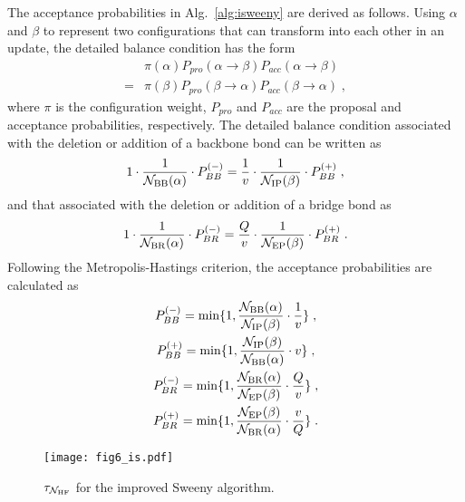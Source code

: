 \documentclass[aps,pre,twocolumn,superscriptaddress,longbibliography,floatfix]{revtex4-2}
\begin{document}
The acceptance probabilities in Alg.~\ref{alg:isweeny} are derived as follows.
Using {$\alpha$ and $\beta$} to represent two configurations that can transform into each other in an update, the detailed balance condition has the form
\begin{align}
&\pi(\alpha){P_{pro}}(\alpha\rightarrow \beta){P_{acc}}(\alpha \rightarrow \beta)\\ \nonumber
=&\pi(\beta){P_{pro}}(\beta\rightarrow \alpha){P_{acc}}(\beta \rightarrow \alpha) \;,
\end{align}
where $\pi$ is the configuration weight, $P_{pro}$ and $P_{acc}$ are the proposal and acceptance probabilities, respectively.
The detailed balance condition associated with the deletion or addition of a backbone bond can be written as
\begin{align}
    1 \cdot \frac{1}{\mathcal{N}_{\rm BB}(\alpha)} \cdot P^{(-)}_{BB} = \frac{1}{v} \cdot \frac{1}{\mathcal{N}_{\rm IP}(\beta)} \cdot P^{(+)}_{BB} \;, 
\end{align}
and that associated with the deletion or addition of a bridge bond as
\begin{align}
    1 \cdot \frac{1}{\mathcal{N}_{\rm BR}(\alpha)} \cdot P^{(-)}_{BR} = \frac{Q}{v} \cdot \frac{1}{\mathcal{N}_{\rm EP}(\beta)} \cdot P^{(+)}_{BR} \;.
\end{align}
Following the Metropolis-Hastings criterion, the acceptance probabilities are calculated as
\begin{gather}
     P^{(-)}_{BB} =\min \{ 1,\frac{\mathcal{N}_{\rm BB}(\alpha)}{\mathcal{N}_{\rm IP}(\beta)} \cdot \frac{1}{v} \} \;,\label{eq:accDeletingBB} \\
     P^{(+)}_{BB} =\min \{ 1,\frac{\mathcal{N}_{\rm IP}(\beta)}{\mathcal{N}_{\rm BB}(\alpha)} \cdot v \} \;,  \\
     P^{(-)}_{BR} =\min \{ 1,\frac{\mathcal{N}_{\rm BR}(\alpha)}{\mathcal{N}_{\rm EP}(\beta)} \cdot \frac{Q}{v} \} \;, \label{eq:accDeletingBR} \\
     P^{(+)}_{BR} =\min \{ 1,\frac{\mathcal{N}_{\rm EP}(\beta)}{\mathcal{N}_{\rm BR}(\alpha)} \cdot \frac{v}{Q} \} \;. \label{eq:accAddingBR}
\end{gather}

\begin{figure}[t] 
\centering
\texttt{[image: fig6\_is.pdf]}
\caption{$\tau_{\mathcal{N}_{\rm HF}}$ for the improved Sweeny algorithm.}
\label{tauNHF:isweeny}
\end{figure}
\end{document}
